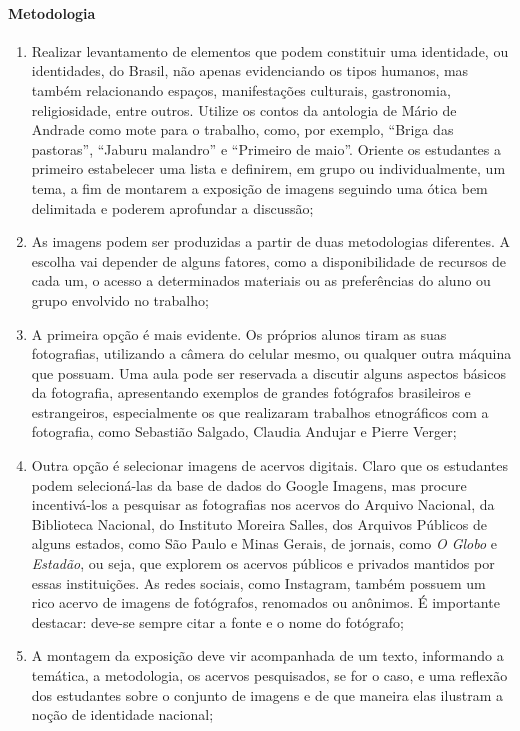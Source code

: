 \documentclass[12pt]{extarticle}
\begin{document}
{\paragraph{Metodologia} 
\begin{enumerate}
\item
Realizar levantamento de elementos que podem
constituir uma identidade, ou identidades, do Brasil, não apenas
evidenciando os tipos humanos, mas também relacionando espaços,
manifestações culturais, gastronomia, religiosidade, entre outros.
Utilize os contos da antologia de Mário de Andrade como mote para o
trabalho, como, por exemplo, ``Briga das pastoras'', ``Jaburu malandro''
e ``Primeiro de maio''. Oriente os estudantes a primeiro estabelecer uma
lista e definirem, em grupo ou individualmente, um tema, a fim de
montarem a exposição de imagens seguindo uma ótica bem delimitada e
poderem aprofundar a discussão;

\item As imagens podem ser produzidas a partir de duas metodologias
diferentes. A escolha vai depender de alguns fatores, como a
disponibilidade de recursos de cada um, o acesso a determinados
materiais ou as preferências do aluno ou grupo envolvido no trabalho;

\item A primeira opção é mais evidente. Os próprios alunos tiram as suas
fotografias, utilizando a câmera do celular mesmo, ou qualquer outra
máquina que possuam. Uma aula pode ser reservada a discutir alguns
aspectos básicos da fotografia, apresentando exemplos de grandes
fotógrafos brasileiros e estrangeiros, especialmente os que realizaram
trabalhos etnográficos com a fotografia, como Sebastião Salgado, Claudia
Andujar e Pierre Verger;

\item Outra opção é selecionar imagens de acervos digitais. Claro que os
estudantes podem selecioná-las da base de dados do Google Imagens, mas
procure incentivá-los a pesquisar as fotografias nos acervos do Arquivo
Nacional, da Biblioteca Nacional, do Instituto Moreira Salles, dos
Arquivos Públicos de alguns estados, como São Paulo e Minas Gerais, de
jornais, como \emph{O Globo} e \emph{Estadão}, ou seja, que explorem os
acervos públicos e privados mantidos por essas instituições. As redes
sociais, como Instagram, também possuem um rico acervo de imagens de
fotógrafos, renomados ou anônimos. É importante destacar: deve-se sempre
citar a fonte e o nome do fotógrafo;

\item A montagem da exposição deve vir acompanhada de um texto, informando
a temática, a metodologia, os acervos pesquisados, se for o caso, e uma
reflexão dos estudantes sobre o conjunto de imagens e de que maneira
elas ilustram a noção de identidade nacional;


\end{enumerate}}
\end{document}
